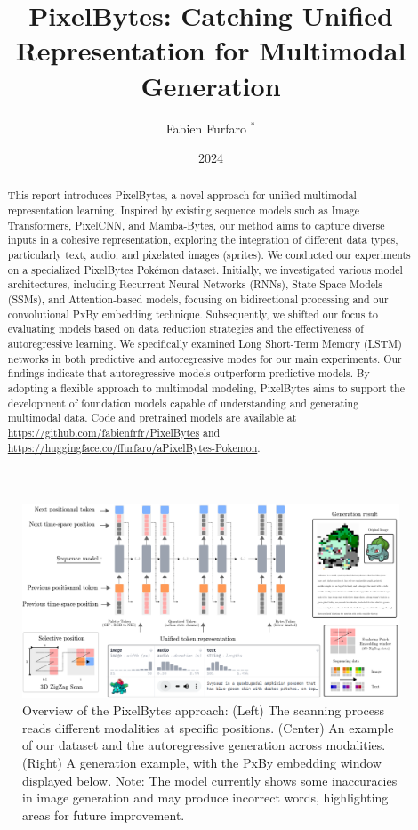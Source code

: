 \documentclass[10pt,a4paper]{article}
\title{\Large\textbf{PixelBytes: Catching Unified Representation for Multimodal Generation}}
\author{\large Fabien Furfaro $^{*}$}
\date{\large 2024}
\begin{document}
\maketitle

\let\thefootnote\relax{}

\begin{abstract}
This report introduces PixelBytes, a novel approach for unified multimodal representation learning. Inspired by existing sequence models such as Image Transformers, PixelCNN, and Mamba-Bytes, our method aims to capture diverse inputs in a cohesive representation, exploring the integration of different data types, particularly text, audio, and pixelated images (sprites). We conducted our experiments on a specialized PixelBytes Pokémon dataset. Initially, we investigated various model architectures, including Recurrent Neural Networks (RNNs), State Space Models (SSMs), and Attention-based models, focusing on bidirectional processing and our convolutional PxBy embedding technique. Subsequently, we shifted our focus to evaluating models based on data reduction strategies and the effectiveness of autoregressive learning. We specifically examined Long Short-Term Memory (LSTM) networks in both predictive and autoregressive modes for our main experiments. Our findings indicate that autoregressive models outperform predictive models. By adopting a flexible approach to multimodal modeling, PixelBytes aims to support the development of foundation models capable of understanding and generating multimodal data. Code and pretrained models are available at \url{https://github.com/fabienfrfr/PixelBytes} and \url{https://huggingface.co/ffurfaro/aPixelBytes-Pokemon}.
\end{abstract}

\begin{figure}[ht]
\centering
\includegraphics[width=0.8\linewidth]{aPxBy_approach.pdf}
\caption{Overview of the PixelBytes approach: (Left) The scanning process reads different modalities at specific positions. (Center) An example of our dataset and the autoregressive generation across modalities. (Right) A generation example, with the PxBy embedding window displayed below. Note: The model currently shows some inaccuracies in image generation and may produce incorrect words, highlighting areas for future improvement.}
\label{fig:approach_overview}
\end{figure}
\end{document}
